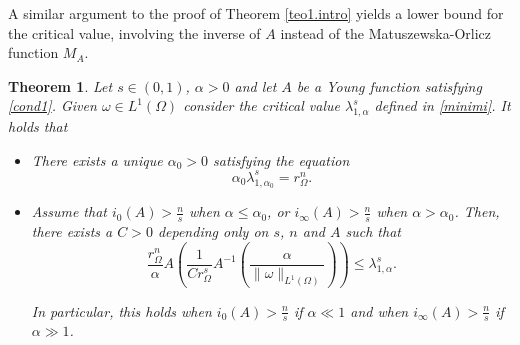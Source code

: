 \documentclass[12pt,reqno]{amsart}
\newtheorem{thm}{Theorem}[section]
\theoremstyle{definition}
\theoremstyle{remark}
\numberwithin{equation}{section}
\begin{document}
A similar argument to the proof of Theorem \ref{teo1.intro} yields a lower bound for the critical value, involving the inverse of $A$ instead of the Matuszewska-Orlicz function $M_A$.
 
\begin{thm}  \label{teo2}
Let $s\in (0,1)$, $\alpha>0$ and let $A$ be a Young function satisfying \eqref{cond1}. Given $\omega \in L^1(\Omega)$ consider the critical value $\lambda_{1,\alpha}^s$  defined in \eqref{minimi}. It holds that
\begin{itemize}
\item[i)] There exists a unique $\alpha_0>0$ satisfying the equation
$$
\alpha_0 \lambda_{1,\alpha_0}^s = r_\Omega^n.
$$

\item[ii)] 
Assume that $i_0(A)>\frac{n}{s}$ when $\alpha\leq \alpha_0$, or $i_\infty(A) >\frac{n}{s}$ when $\alpha> \alpha_0$.  Then, there exists a  $C>0$ depending only on  $s$, $n$ and $A$ such that
\begin{equation} \label{ineq.2}
\frac{r_\Omega^n}{\alpha} A\left( \frac{1}{C r_\Omega ^s}A^{-1}\left( \frac{\alpha}{ \|\omega\|_{L^1(\Omega)}} \right) \right)
\leq 
    \lambda_{1,\alpha}^s.
\end{equation}


\noindent In particular, this holds when $i_0(A)>\frac{n}{s}$ if $\alpha\ll1$ and when $i_\infty(A) >\frac{n}{s}$ if $\alpha\gg1$.
\end{itemize}
\end{thm}
\end{document}
